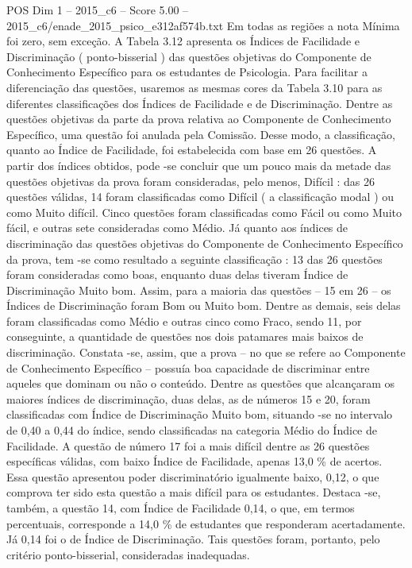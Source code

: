 \begin{textsample}{POS Dim 1 – 2015\_c6 – Score 5.00 – 2015\_c6/enade\_2015\_psico\_e312af574b.txt}
Em todas as regiões a nota Mínima foi zero, sem exceção.
A Tabela 3.12 apresenta os Índices de Facilidade e Discriminação ( ponto-bisserial ) das questões objetivas do Componente de Conhecimento Específico para os estudantes de Psicologia.
Para facilitar a diferenciação das questões, usaremos as mesmas cores da Tabela 3.10 para as diferentes classificações dos Índices de Facilidade e de Discriminação.
Dentre as questões objetivas da parte da prova relativa ao Componente de Conhecimento Específico, uma questão foi anulada pela Comissão.
Desse modo, a classificação, quanto ao Índice de Facilidade, foi estabelecida com base em 26 questões.
A partir dos índices obtidos, pode -se concluir que um pouco mais da metade das questões objetivas da prova foram consideradas, pelo menos, Difícil : das 26 questões válidas, 14 foram classificadas como Difícil ( a classificação modal ) ou como Muito difícil.
Cinco questões foram classificadas como Fácil ou como Muito fácil, e outras sete consideradas como Médio.
Já quanto aos índices de discriminação das questões objetivas do Componente de Conhecimento Específico da prova, tem -se como resultado a seguinte classificação : 13 das 26 questões foram consideradas como boas, enquanto duas delas tiveram Índice de Discriminação Muito bom.
Assim, para a maioria das questões – 15 em 26 – os Índices de Discriminação foram Bom ou Muito bom.
Dentre as demais, seis delas foram classificadas como Médio e outras cinco como Fraco, sendo 11, por conseguinte, a quantidade de questões nos dois patamares mais baixos de discriminação.
Constata -se, assim, que a prova – no que se refere ao Componente de Conhecimento Específico – possuía boa capacidade de discriminar entre aqueles que dominam ou não o conteúdo.
Dentre as questões que alcançaram os maiores índices de discriminação, duas delas, as de números 15 e 20, foram classificadas com Índice de Discriminação Muito bom, situando -se no intervalo de 0,40 a 0,44 do índice, sendo classificadas na categoria Médio do Índice de Facilidade.
A questão de número 17 foi a mais difícil dentre as 26 questões específicas válidas, com baixo Índice de Facilidade, apenas 13,0 \% de acertos.
Essa questão apresentou poder discriminatório igualmente baixo, 0,12, o que comprova ter sido esta questão a mais difícil para os estudantes.
Destaca -se, também, a questão 14, com Índice de Facilidade 0,14, o que, em termos percentuais, corresponde a 14,0 \% de estudantes que responderam acertadamente.
Já 0,14 foi o de Índice de Discriminação.
Tais questões foram, portanto, pelo critério ponto-bisserial, consideradas inadequadas.

\end{textsample}
